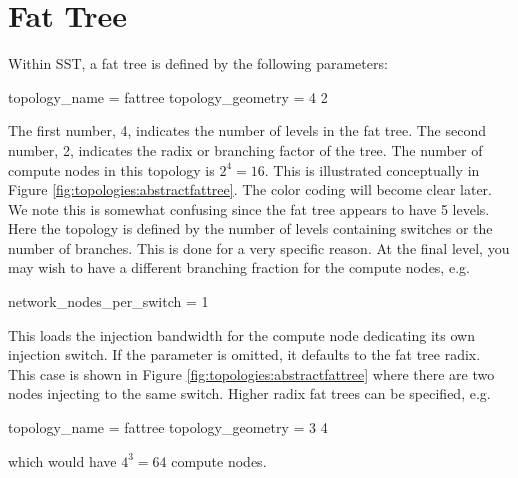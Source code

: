 
\section{Fat Tree}
\label{sec:tutorial:fattree}

Within SST, a fat tree is defined by the following parameters:

\begin{ViFile}
topology_name = fattree
topology_geometry = 4 2
\end{ViFile}
The first number, 4, indicates the number of levels in the fat tree.
The second number, 2, indicates the radix or branching factor of the tree.
The number of compute nodes in this topology is $2^4 = 16$.
This is illustrated conceptually in Figure \ref{fig:topologies:abstractfattree}.
The color coding will become clear later.
We note this is somewhat confusing since the fat tree appears to have 5 levels.
Here the topology is defined by the number of levels containing switches or the number of branches.
This is done for a very specific reason.  
At the final level, you may wish to have a different branching fraction for the compute nodes, e.g.

\begin{ViFile}
network_nodes_per_switch = 1
\end{ViFile}
This loads the injection bandwidth for the compute node dedicating its own injection switch.
If the parameter  is omitted, it defaults to the fat tree radix.
This case is shown in Figure \ref{fig:topologies:abstractfattree} where there are two nodes injecting to the same switch.
Higher radix fat trees can be specified, e.g.

\begin{ViFile}
topology_name = fattree
topology_geometry = 3 4
\end{ViFile}
which would have $4^3 = 64$ compute nodes.

